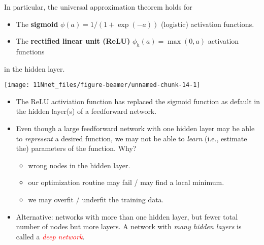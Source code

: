 \documentclass[10pt,ignorenonframetext,]{beamer}
\providecommand{\tightlist}{%
  \setlength{\itemsep}{0pt}\setlength{\parskip}{0pt}}
\begin{document}
\begin{frame}

In particular, the universal approximation theorem holds for

\begin{itemize}
\tightlist
\item
  The \textbf{sigmoid} \(\phi(a)=1/(1+\exp(-a))\) (logistic) activation
  functions.
\item
  The \textbf{rectified linear unit (ReLU)} \(\phi_h(a)=\max(0,a)\)
  activation functions
\end{itemize}

in the hidden layer.

\center

\texttt{[image: 11Nnet\_files/figure-beamer/unnamed-chunk-14-1]}

\end{frame}

\begin{frame}

\begin{itemize}
\tightlist
\item
  The ReLU activiation function has replaced the sigmoid function as
  default in the hidden layer(s) of a feedforward network.
\end{itemize}

\vspace{2mm}

\begin{itemize}
\tightlist
\item
  Even though a large feedforward network with one hidden layer may be
  able to \emph{represent} a desired function, we may not be able to
  \emph{learn} (i.e., estimate the) parameters of the function. Why?

  \begin{itemize}
  \tightlist
  \item
    wrong nodes in the hidden layer.
  \item
    our optimization routine may fail / may find a local minimum.
  \item
    we may overfit / underfit the training data.
  \end{itemize}
\end{itemize}

\vspace{2mm}

\begin{itemize}
\tightlist
\item
  Alternative: networks with more than one hidden layer, but fewer total
  number of nodes but more layers. A network with \emph{many hidden
  layers} is called a \emph{\textcolor{red}{deep network}}.
\end{itemize}

\end{frame}
\end{document}
